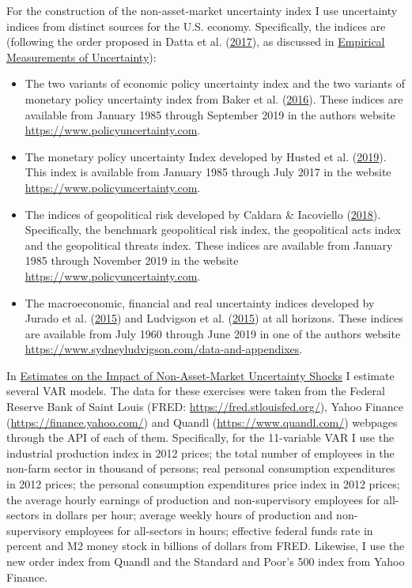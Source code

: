 \documentclass[12pt,twoside]{reedthesis}
\providecommand{\tightlist}{%
  \setlength{\itemsep}{0pt}\setlength{\parskip}{0pt}}
\begin{document}
For the construction of the non-asset-market uncertainty index I use uncertainty indices from distinct sources for the U.S. economy. Specifically, the indices are (following the order proposed in Datta et al. (\protect\hyperlink{ref-dattetal:2017}{2017}), as discussed in \protect\hyperlink{empirical-measurements-of-uncertainty}{Empirical Measurements of Uncertainty}):
\begin{itemize}
\tightlist
\item
  The two variants of economic policy uncertainty index and the two variants of monetary policy uncertainty index from Baker et al. (\protect\hyperlink{ref-bakeetal:2016}{2016}). These indices are available from January 1985 through September 2019 in the authors website \url{https://www.policyuncertainty.com}.
\item
  The monetary policy uncertainty Index developed by Husted et al. (\protect\hyperlink{ref-hustetal:2019}{2019}). This index is available from January 1985 through July 2017 in the website \url{https://www.policyuncertainty.com}.
\item
  The indices of geopolitical risk developed by Caldara \& Iacoviello (\protect\hyperlink{ref-caldiaco:2018}{2018}). Specifically, the benchmark geopolitical risk index, the geopolitical acts index and the geopolitical threats index. These indices are available from January 1985 through November 2019 in the website \url{https://www.policyuncertainty.com}.
\item
  The macroeconomic, financial and real uncertainty indices developed by Jurado et al. (\protect\hyperlink{ref-juraetal:2015}{2015}) and Ludvigson et al. (\protect\hyperlink{ref-ludvetal:2015}{2015}) at all horizons. These indices are available from July 1960 through June 2019 in one of the authors website \url{https://www.sydneyludvigson.com/data-and-appendixes}.
\end{itemize}
In \protect\hyperlink{estimates-on-the-impact-of-non-asset-market-uncertainty-shocks}{Estimates on the Impact of Non-Asset-Market Uncertainty Shocks} I estimate several VAR models. The data for these exercises were taken from the Federal Reserve Bank of Saint Louis (FRED: \url{https://fred.stlouisfed.org/}), Yahoo Finance (\url{https://finance.yahoo.com/}) and Quandl (\url{https://www.quandl.com/}) webpages through the API of each of them. Specifically, for the 11-variable VAR I use the industrial production index in 2012 prices; the total number of employees in the non-farm sector in thousand of persons; real personal consumption expenditures in 2012 prices; the personal consumption expenditures price index in 2012 prices; the average hourly earnings of production and non-supervisory employees for all-sectors in dollars per hour; average weekly hours of production and non-supervisory employees for all-sectors in hours; effective federal funds rate in percent and M2 money stock in billions of dollars from FRED. Likewise, I use the new order index from Quandl and the Standard and Poor's 500 index from Yahoo Finance.
\end{document}
